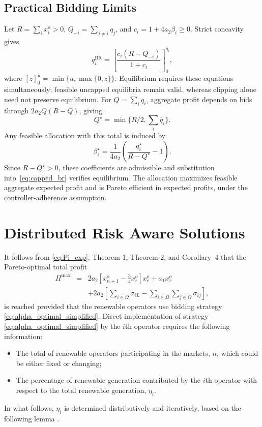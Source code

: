 \documentclass[journal]{IEEEtran}
\begin{document}
\subsection{Practical Bidding Limits}
Let $R=\sum_i x_i^o>0$, $Q_{-i}=\sum_{j\ne i}q_j$, and $c_i=1+4a_2\beta_i\ge0$. Strict concavity gives
\begin{equation}
q_i^{\mathrm{BR}}=\left[\frac{c_i(R-Q_{-i})}{1+c_i}\right]_0^{\overline q_i},
\label{eq:capped_br}
\end{equation}
where $[z]_0^u=\min\{u,\max\{0,z\}\}$. Equilibrium requires these equations simultaneously; feasible uncapped equilibria remain valid, whereas clipping alone need not preserve equilibrium.
For $Q=\sum_iq_i$, aggregate profit depends on bids through $2a_2Q(R-Q)$, giving
\begin{equation}
Q^\star=\min\{R/2,\sum_i\overline q_i\}.
\label{eq:capped_total}
\end{equation}
Any feasible allocation with this total is induced by
\begin{equation}
\beta_i^\star=\frac{1}{4a_2}\left(\frac{q_i^\star}{R-Q^\star}-1\right).
\label{eq:capped_design}
\end{equation}
Since $R-Q^\star>0$, these coefficients are admissible and substitution into~\eqref{eq:capped_br} verifies equilibrium. The allocation maximizes feasible aggregate expected profit and is Pareto efficient in expected profits, under the controller-adherence assumption.

\section{Distributed Risk Aware Solutions}

It follows from \eqref{eq:Pi_exp}, Theorem 1, Theorem 2, and Corollary~4 that the Pareto-optimal total profit 
\begin{eqnarray*}
    \Pi^{\max}  
     & = & 2a_2\left[  x_{n+1}^o - \frac{3}{4} x_r^o \right]x_r^o   +a_1 x_r^o  \nonumber \\ && 
     + 2a_2 \left[ \sum_{i\in\Omega} \sigma_{iL} -\sum_{i\in\Omega}\sum_{j\in\Omega}\sigma_{ij}\right],
\end{eqnarray*}
is reached provided that the renewable operators use bidding strategy \eqref{eq:alpha_optimal_simplified}.
Direct implementation of strategy \eqref{eq:alpha_optimal_simplified} by the $i$th operator requires the following information:
\begin{itemize}
    \item The total of renewable operators participating in the markets, $n$, which could be either fixed or changing; 
    \item The percentage of renewable generation contributed by the $i$th operator with respect to the total renewable generation, $\eta_i$.
\end{itemize}
In what follows, $\eta_i$ is determined distributively and iteratively, based on the following lemma \cite{qu}. 
\end{document}
